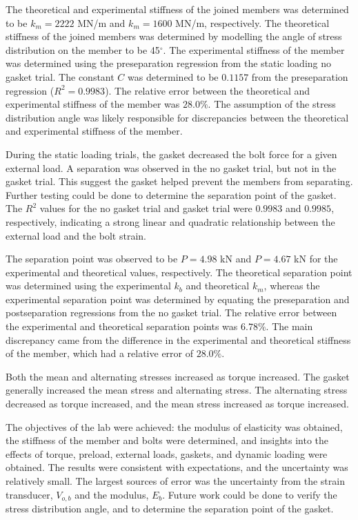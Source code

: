 The theoretical and experimental stiffness of the joined members was determined to be $k_m = 2222$ MN/m and $k_m = 1600$ MN/m, respectively. The theoretical stiffness of the joined members was determined by modelling the angle of stress distribution on the member to be 45$^\circ$. The experimental stiffness of the member was determined using the preseparation regression from the static loading no gasket trial. The constant $C$ was determined to be $0.1157$ from the preseparation regression ($R^2 = 0.9983$). The relative error between the theoretical and experimental stiffness of the member was $28.0\%$. The assumption of the stress distribution angle was likely responsible for discrepancies between the theoretical and experimental stiffness of the member. 

During the static loading trials, the gasket decreased the bolt force for a given external load. A separation was observed in the no gasket trial, but not in the gasket trial. This suggest the gasket helped prevent the members from separating. Further testing could be done to determine the separation point of the gasket. The $R^2$ values for the no gasket trial and gasket trial were $0.9983$ and $0.9985$, respectively, indicating a strong linear and quadratic relationship between the external load and the bolt strain. 

The separation point was observed to be $P = 4.98$ kN and $P = 4.67$ kN for the experimental and theoretical values, respectively. The theoretical separation point was determined using the experimental $k_b$ and theoretical $k_m$, whereas the experimental separation point was determined by equating the preseparation and postseparation regressions from the no gasket trial. The relative error between the experimental and theoretical separation points was $6.78\%$. The main discrepancy came from the difference in the experimental and theoretical stiffness of the member, which had a relative error of $28.0\%$.

Both the mean and alternating stresses increased as torque increased. The gasket generally increased the mean stress and alternating stress. The alternating stress decreased as torque increased, and the mean stress increased as torque increased.

The objectives of the lab were achieved: the modulus of elasticity was obtained, the stiffness of the member and bolts were determined, and insights into the effects of torque, preload, external loads, gaskets, and dynamic loading were obtained. The results were consistent with expectations, and the uncertainty was relatively small. The largest sources of error was the uncertainty from the strain transducer, $V_{o, b}$ and the modulus, $E_b$. Future work could be done to verify the stress distribution angle, and to determine the separation point of the gasket.

